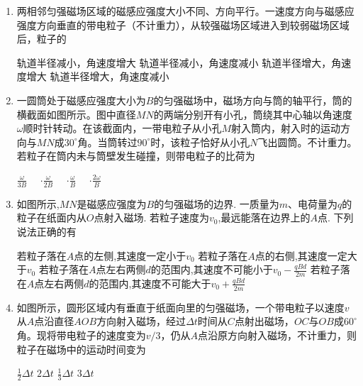\begin{enumerate}[leftmargin=0em]
\item
{}
两相邻匀强磁场区域的磁感应强度大小不同、方向平行。一速度方向与磁感应强度方向垂直的带电粒子（不计重力），从较强磁场区域进入到较弱磁场区域后，粒子的  


\fourchoices
{轨道半径减小，角速度增大}
{轨道半径减小，角速度减小}
{轨道半径增大，角速度增大}
{轨道半径增大，角速度减小}


\item
{}
一圆筒处于磁感应强度大小为$ B $的匀强磁场中，磁场方向与筒的轴平行，筒的横截面如图所示。图中直径$ MN $的两端分别开有小孔，筒绕其中心轴以角速度$ \omega $顺时针转动。在该截面内，一带电粒子从小孔$ M $射入筒内，射入时的运动方向与$ MN $成$ 30 ^{ \circ } $角。当筒转过$ 90 ^{ \circ } $时，该粒子恰好从小孔$ N $飞出圆筒。不计重力。若粒子在筒内未与筒壁发生碰撞，则带电粒子的比荷为  
\begin{figure}[h!]
\centering

\end{figure}
\fourchoices
{$\frac { \omega } { 3 B } \quad $}
{$ \cdot \frac { \omega } { 2 B } \quad $}
{$ \cdot \frac { \omega } { B } \quad $}
{$ \cdot \frac { 2 \omega } { B }$}


\item
{}
如图所示,$ MN $是磁感应强度为$ B $的匀强磁场的边界. 一质量为$ m $、电荷量为$ q $的粒子在纸面内从$ O $点射入磁场. 若粒子速度为$ v_{0} $,最远能落在边界上的$ A $点. 下列说法正确的有  
\begin{figure}[h!]
\centering

\end{figure}



\fourchoices
{若粒子落在$ A $点的左侧,其速度一定小于$ v_{0} $}
{若粒子落在$ A $点的右侧,其速度一定大于$ v_{0} $}
{若粒子落在$ A $点左右两侧$ d $的范围内,其速度不可能小于$v _ { 0 } - \frac { q B d } { 2 m }$}
{若粒子落在$ A $点左右两侧$ d $的范围内,其速度不可能大于$v _ { 0 } + \frac { q B d } { 2 m }$}




\item
{}
如图所示，圆形区域内有垂直于纸面向里的匀强磁场，一个带电粒子以速度$ v $从$ A $点沿直径$ AOB $方向射入磁场，经过$ \Delta $$ t $时间从$ C $点射出磁场，$ OC $与$ OB $成$ 60 ^{ \circ } $角。现将带电粒子的速度变为$ v/3 $，仍从$ A $点沿原方向射入磁场，不计重力，则粒子在磁场中的运动时间变为  
\begin{figure}[h!]
\centering

\end{figure}
\fourchoices
{$ \frac { 1 } { 2 } \Delta t$}
{$ 2 \Delta t$}
{$ \frac { 1 } { 3 } \Delta t$}
{$ 3 \Delta t$}




\end{enumerate}
